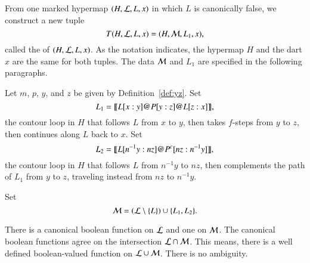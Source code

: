 \begin{definition}[transform]
  From one marked hypermap $(H,{\cal L},L,x)$ in which $L$ is
  canonically false, we construct a new tuple
\begin{displaymath}
T(H,{\cal L},L,x) = (H,{\cal M},L_1,x),
\end{displaymath}
 called the  of
  $(H,{\cal{L}},L,x)$.  
As the notation indicates, the hypermap $H$ and the dart $x$ are the same for both
tuples.  The data ${\cal M}$ and $L_1$ are specified in
the following paragraphs.
\end{definition}

Let $m$, $p$, $y$, and $z$ be  given by
Definition~\ref{def:yz}.
Set
\begin{displaymath}
L_1 = {\llbracket{L[x:y] {{\operatorname{@}}}P[y:z] {{\operatorname{@}}}L[z:x]}\rrbracket},
\end{displaymath}
the contour loop in $H$ that follows $L$ from $x$ to $y$, then takes
$f$-steps from $y$ to $z$, then continues along $L$ back to $x$.  
Set 
\begin{displaymath}
L_2 = {\llbracket{L[n^{-1}y:n z] {{\operatorname{@}}}P^c[n z:n^{-1}y]}\rrbracket},
\end{displaymath}
the contour loop in $H$ that follows $L$ from $n^{-1} y$ to $n z$,
then complements the path of $L_1$ from $y$ to $z$, traveling instead
from $n z$ to $n^{-1} y$. 


Set
\begin{displaymath}{\cal M} = ({\cal L}\setminus \{L\}) \cup
\{L_1,L_2\}.\end{displaymath}

\begin{remark}
There is a canonical boolean function on ${\cal L}$ and one on ${\cal M}$.
The canonical boolean functions agree on the intersection ${\cal L}\cap {\cal M}$.
This means, there is a well defined boolean-valued function on 
${\cal L}\cup {\cal M}$.  There is no ambiguity.  
\end{remark}
%





